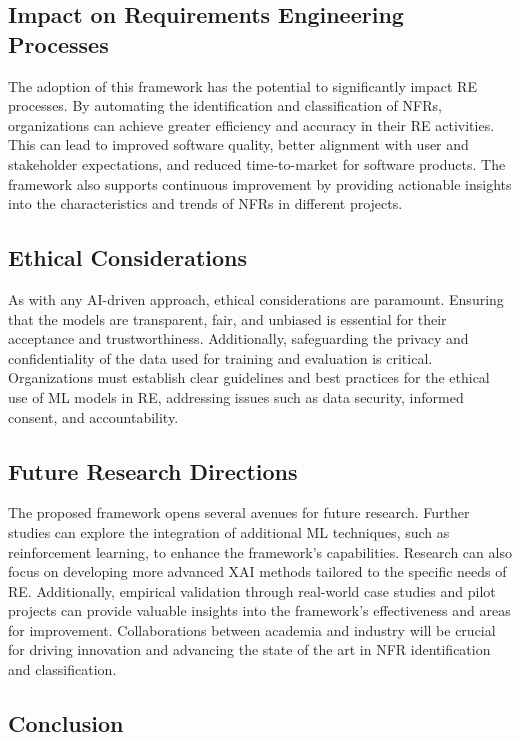 \documentclass[sigconf,natbib=false]{acmart}
\begin{document}
\subsection{Impact on Requirements Engineering Processes}
The adoption of this framework has the potential to significantly impact RE processes. By automating the identification and classification of NFRs, organizations can achieve greater efficiency and accuracy in their RE activities. This can lead to improved software quality, better alignment with user and stakeholder expectations, and reduced time-to-market for software products. The framework also supports continuous improvement by providing actionable insights into the characteristics and trends of NFRs in different projects.

\subsection{Ethical Considerations}
As with any AI-driven approach, ethical considerations are paramount. Ensuring that the models are transparent, fair, and unbiased is essential for their acceptance and trustworthiness. Additionally, safeguarding the privacy and confidentiality of the data used for training and evaluation is critical. Organizations must establish clear guidelines and best practices for the ethical use of ML models in RE, addressing issues such as data security, informed consent, and accountability.

\subsection{Future Research Directions}
The proposed framework opens several avenues for future research. Further studies can explore the integration of additional ML techniques, such as reinforcement learning, to enhance the framework's capabilities. Research can also focus on developing more advanced XAI methods tailored to the specific needs of RE. Additionally, empirical validation through real-world case studies and pilot projects can provide valuable insights into the framework's effectiveness and areas for improvement. Collaborations between academia and industry will be crucial for driving innovation and advancing the state of the art in NFR identification and classification.

\subsection{Conclusion}
\end{document}
